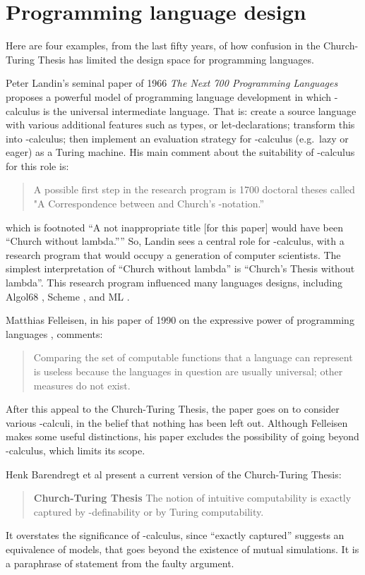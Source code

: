 \documentclass[a4paper]{article}
\begin{document}
\section{Programming language design} 
\label{sec:design}

Here are four examples, from the last fifty years, of how confusion in the
Church-Turing Thesis has limited the design space for programming
languages.


Peter Landin's seminal paper of 1966 {\em The Next 700 Programming Languages}
\cite{Landin66} proposes a powerful model of programming language
development in which -calculus is the universal intermediate
language.  That is: create a source language with various additional
features such as types, or let-declarations; transform this into
-calculus; then implement an evaluation strategy for -calculus
(e.g.\ lazy or eager) as a Turing machine.  His main comment about the
suitability of  -calculus for this role is:
\begin{quote}
A possible first step in the research program is 1700 doctoral
theses called "A Correspondence between  and Church's -notation.''
\end{quote}
which is footnoted ``A not inappropriate title [for this paper] would
have been ``Church without lambda.''''  So, Landin sees a central role
for -calculus, with a research program that would occupy a
generation of computer scientists.  The simplest
interpretation of ``Church without lambda'' is ``Church's Thesis
without lambda''.  This research program influenced many languages
designs, including Algol68 \cite{Rey81}, Scheme
\cite{sussman-steele75}, and ML
\cite{Tofte:89:TheDefinitionOfStandardML}.


Matthias Felleisen, in his paper of 1990 on the expressive power of
programming languages \cite{Felleisen90onthe}, comments:
\begin{quote}
Comparing the set of computable functions that a language can
represent is useless because the languages in question are usually
universal; other measures do not exist.
\end{quote}
After this appeal to the Church-Turing Thesis, the paper goes on to
consider various -calculi, in the belief that nothing has been
left out. Although Felleisen makes some useful distinctions, his paper
excludes the possibility of going beyond -calculus, which limits
its scope.

Henk Barendregt et al \cite{BarendregtMP13} present a current version
of the Church-Turing Thesis:
\begin{quote}
{\bf Church-Turing Thesis}
The notion of intuitive computability is exactly captured by
-definability or by Turing computability.
\end{quote}
It overstates the significance of -calculus, since ``exactly
captured'' suggests an equivalence of models, that goes beyond the
existence of mutual simulations.  It is a paraphrase of statement
 from the faulty argument.
\end{document}
